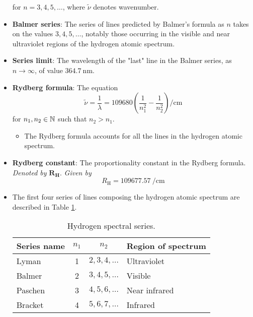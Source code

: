 \documentclass[../notes.tex]{subfiles}
\begin{document}
\begin{itemize}
\begin{equation*}
    \end{equation*}
    for $n=3,4,5,\dots$, where $\tilde{\nu}$ denotes wavenumber.
    \item \textbf{Balmer series}: The series of lines predicted by Balmer's formula as $n$ takes on the values $3,4,5,\dots$, notably those occurring in the visible and near ultraviolet regions of the hydrogen atomic spectrum.
    \item \textbf{Series limit}: The wavelength of the "last" line in the Balmer series, as $n\to\infty$, of value $\SI{364.7}{\nano\meter}$.
    \item \textbf{Rydberg formula}: The equation
    \begin{equation*}
        \tilde{\nu} = \frac{1}{\lambda} = \num{109680}\left( \frac{1}{n_1^2}-\frac{1}{n_2^2} \right)\si{\per\centi\meter}
    \end{equation*}
    for $n_1,n_2\in\mathbb{N}$ such that $n_2>n_1$.
    \begin{itemize}
        \item The Rydberg formula accounts for all the lines in the hydrogen atomic spectrum.
    \end{itemize}
    \item \textbf{Rydberg constant}: The proportionality constant in the Rydberg formula. \emph{Denoted by} $\bm{R_\textbf{H}}$. \emph{Given by}
    \begin{equation*}
        R_\text{H}^{} = \SI{109677.57}{\per\centi\meter}
    \end{equation*}
    \item The first four series of lines composing the hydrogen atomic spectrum are described in Table \ref{tab:spectralSeriesH}.
    \begin{table}[h!]
        \centering
        \renewcommand{\arraystretch}{1.4}
        \small
        \begin{tabular}{lccl}
            \toprule
            Series name & $n_1$ & $n_2$ & Region of spectrum\\
            \hline
            Lyman   & 1 & $2,3,4,\dots$ & Ultraviolet\\
            Balmer  & 2 & $3,4,5,\dots$ & Visible\\
            Paschen & 3 & $4,5,6,\dots$ & Near infrared\\
            Bracket & 4 & $5,6,7,\dots$ & Infrared\\
            \toprule
        \end{tabular}
        \caption{Hydrogen spectral series.}
        \label{tab:spectralSeriesH}

\end{table}
\end{itemize}
\end{document}
